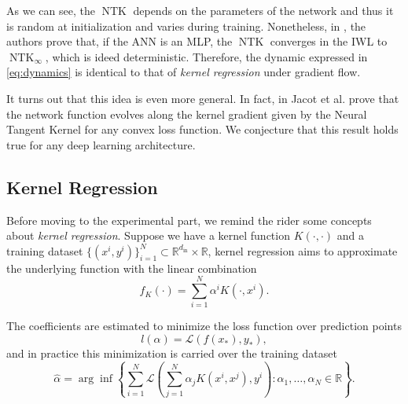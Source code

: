 \documentclass[11pt,notitlepage]{article}
\numberwithin{equation}{section}
\def\R{{\mathbb{R}}}
\DeclareMathOperator{\NTK}{NTK}
\theoremstyle{remark}
\theoremstyle{definition}
\begin{document}
	As we can see, the $\NTK$ depends on the parameters of the network and thus it is random at initialization and varies during training.
	Nonetheless, in \cite{jacot2018neural}, the authors prove that, if the ANN is an MLP, the $\NTK$ converges in the IWL to $\NTK_\infty$, which is ideed deterministic.
	Therefore, the dynamic expressed in \eqref{eq:dynamics} is identical to that of \emph{kernel regression} under gradient flow.
	
	It turns out that this idea is even more general.
	In fact, in \cite{jacot2018neural} Jacot et al. prove that the network function evolves along the kernel gradient given by the Neural Tangent Kernel for any convex loss function.
	We conjecture that this result holds true for any deep learning architecture.
	
	\subsection{Kernel Regression}\label{subsec:kernelRegression}
	
	Before moving to the experimental part, we remind the rider some concepts about \emph{kernel regression}.
	Suppose we have a kernel function $K(\cdot, \cdot)$ and a training dataset $\{(x^i, y^i)\}_{i=1}^N \subset \R^{d_\text{in}} \times \R$, kernel regression aims to approximate the underlying function with the linear combination
	\begin{equation}\label{eq:kernelReg}
		f_K(\cdot) = \sum_{i=1}^N \alpha^i K(\cdot, x^i).
	\end{equation}
	
	The coefficients are estimated to minimize the loss function over prediction points
	\begin{equation*}
		l(\alpha) = \mathcal{L}(f(x_*), y_*),
	\end{equation*}
	and in practice this minimization is carried over the training dataset
	\begin{equation}\label{eq:kernelCoeff}
		\widehat{\alpha} = \arg\inf\left\{\sum_{i=1}^N \mathcal{L}\left(\sum_{j=1}^N \alpha_j K(x^i,x^j), y^i\right) : \alpha_1,\dots, \alpha_N \in \R \right\}.
	\end{equation}
	
\end{document}
